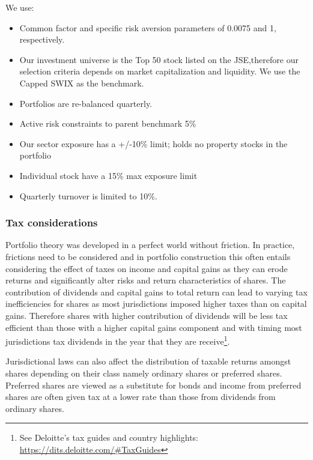 \documentclass[11pt,preprint, authoryear]{elsarticle}
\numberwithin{equation}{section}
\numberwithin{figure}{section}
\numberwithin{table}{section}
\def\tightlist{} %
\let\rmarkdownfootnote\footnote%
\def\footnote{\protect\rmarkdownfootnote}
\begin{document}
We use:

\begin{itemize}
\tightlist
\item
  Common factor and specific risk aversion parameters of 0.0075 and 1,
  respectively.
\item
  Our investment universe is the Top 50 stock listed on the
  JSE,therefore our selection criteria depends on market capitalization
  and liquidity. We use the Capped SWIX as the benchmark.
\item
  Portfolios are re-balanced quarterly.
\item
  Active risk constraints to parent benchmark 5\%
\item
  Our sector exposure has a +/-10\% limit; holds no property stocks in
  the portfolio
\item
  Individual stock have a 15\% max exposure limit
\item
  Quarterly turnover is limited to 10\%.\\
\end{itemize}

\hypertarget{tax-considerations}{%
\subsubsection*{Tax considerations}\label{tax-considerations}}

Portfolio theory was developed in a perfect world without friction. In
practice, frictions need to be considered and in portfolio construction
this often entails considering the effect of taxes on income and capital
gains as they can erode returns and significantly alter risks and return
characteristics of shares. The contribution of dividends and capital
gains to total return can lead to varying tax inefficiencies for shares
as most jurisdictions imposed higher taxes than on capital gains.
Therefore shares with higher contribution of dividends will be less tax
efficient than those with a higher capital gains component and with
timing most jurisdictions tax dividends in the year that they are
receive\footnote{See Deloitte's tax guides and country highlights:
  \url{https://dits.deloitte.com/\#TaxGuides}}.

Jurisdictional laws can also affect the distribution of taxable returns
amongst shares depending on their class namely ordinary shares or
preferred shares. Preferred shares are viewed as a substitute for bonds
and income from preferred shares are often given tax at a lower rate
than those from dividends from ordinary shares.
\end{document}
